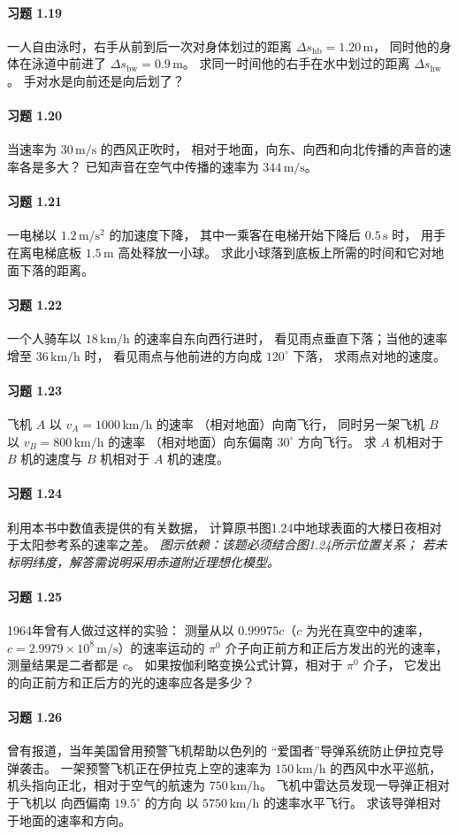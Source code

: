 \paragraph{习题 1.19}
一人自由泳时，右手从前到后一次对身体划过的距离
\(\Delta s_{\mathrm{hb}}=1.20\,\mathrm{m}\)，
同时他的身体在泳道中前进了
\(\Delta s_{\mathrm{bw}}=0.9\,\mathrm{m}\)。
求同一时间他的右手在水中划过的距离
\(\Delta s_{\mathrm{hw}}\)。
手对水是向前还是向后划了？

\paragraph{习题 1.20}
当速率为 \(30\,\mathrm{m/s}\) 的西风正吹时，
相对于地面，向东、向西和向北传播的声音的速率各是多大？
已知声音在空气中传播的速率为 \(344\,\mathrm{m/s}\)。

\paragraph{习题 1.21}
一电梯以 \(1.2\,\mathrm{m/s^2}\) 的加速度下降，
其中一乘客在电梯开始下降后 \(0.5\,\mathrm{s}\) 时，
用手在离电梯底板 \(1.5\,\mathrm{m}\) 高处释放一小球。
求此小球落到底板上所需的时间和它对地面下落的距离。

\paragraph{习题 1.22}
一个人骑车以 \(18\,\mathrm{km/h}\) 的速率自东向西行进时，
看见雨点垂直下落；当他的速率增至 \(36\,\mathrm{km/h}\) 时，
看见雨点与他前进的方向成 \(120^\circ\) 下落，
求雨点对地的速度。

\paragraph{习题 1.23}
飞机 \(A\) 以 \(v_A=1000\,\mathrm{km/h}\) 的速率
（相对地面）向南飞行，
同时另一架飞机 \(B\) 以 \(v_B=800\,\mathrm{km/h}\) 的速率
（相对地面）向东偏南 \(30^\circ\) 方向飞行。
求 \(A\) 机相对于 \(B\) 机的速度与 \(B\) 机相对于 \(A\) 机的速度。

\paragraph{习题 1.24}
利用本书中数值表提供的有关数据，
计算原书图1.24中地球表面的大楼日夜相对于太阳参考系的速率之差。
\textit{图示依赖：该题必须结合图1.24所示位置关系；
若未标明纬度，解答需说明采用赤道附近理想化模型。}

\paragraph{习题 1.25}
1964年曾有人做过这样的实验：
测量从以 \(0.99975c\)（\(c\) 为光在真空中的速率，
\(c=2.9979\times10^8\,\mathrm{m/s}\)）的速率运动的
\(\pi^0\) 介子向正前方和正后方发出的光的速率，
测量结果是二者都是 \(c\)。
如果按伽利略变换公式计算，相对于 \(\pi^0\) 介子，
它发出的向正前方和正后方的光的速率应各是多少？

\paragraph{习题 1.26}
曾有报道，当年美国曾用预警飞机帮助以色列的
“爱国者”导弹系统防止伊拉克导弹袭击。
一架预警飞机正在伊拉克上空的速率为
\(150\,\mathrm{km/h}\) 的西风中水平巡航，
机头指向正北，相对于空气的航速为
\(750\,\mathrm{km/h}\)。
飞机中雷达员发现一导弹正相对于飞机以
向西偏南 \(19.5^\circ\) 的方向
以 \(5750\,\mathrm{km/h}\) 的速率水平飞行。
求该导弹相对于地面的速率和方向。
